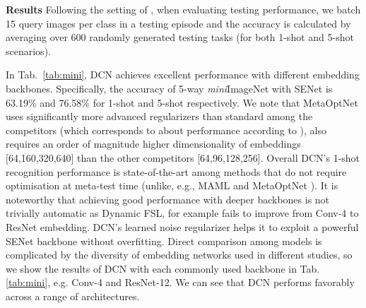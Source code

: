 \documentclass[conference]{IEEEtran}
\def\modelnameshort{DCN}
\def\miniIN{\textit{mini}ImageNet}
\newcommand{\cut}[1]{}
\newcommand{\keypoint}[1]{\vspace{0.05cm}\noindent\textbf{#1}\quad}
\begin{document}
\keypoint{Results}
Following the setting of \cite{snell2017prototypical}, when evaluating testing performance, we batch 15 query images per class in a testing episode and the accuracy is calculated by averaging over 600 randomly generated testing tasks (for both 1-shot and 5-shot scenarios). 
\cut{Firstly, our idea of learned Gaussian noise for better regularisation and multiple metrics can be applied to other metric learning methods (e.g. ProtoNet \cite{snell2017prototypical}), We extended ProtoNet to use four metrics instead of one, and also adding the learned Gaussian Noise for regularisation. Also, for fair comparison, we control different embedding backbones. The results of 5-way-1-shot in Tab~\ref{tab:first} show that while learned noise and multiple metrics also improve the performance of ProtoNet, \modelnameshort{} (RelationNet with 4 metrics and learned noise) is still the best.}
In Tab.~\ref{tab:mini}, \modelnameshort{} achieves excellent performance with different embedding backbones. Specifically, the accuracy of 5-way \miniIN{} with SENet is 63.19\% and 76.58\% for 1-shot and 5-shot respectively. We note that MetaOptNet \cite{lee2019meta} uses significantly more advanced regularizers than standard among the competitors (which corresponds to about  performance according to \cite{lee2019meta}), also requires an order of magnitude higher dimensionality of embeddings [64,160,320,640] than the other competitors [64,96,128,256]. Overall DCN's 1-shot recognition performance is state-of-the-art among methods that do not require optimisation at meta-test time (unlike, e.g., MAML \cite{finn2017model} and MetaOptNet \cite{lee2019meta}). It is noteworthy that achieving good performance with deeper backbones is not trivially automatic as Dynamic FSL, for example fails to improve from Conv-4 to ResNet embedding. DCN's learned noise regularizer helps it to exploit a powerful SENet backbone without overfitting. Direct comparison among models is complicated by the diversity of embedding networks used in different studies, so we show the results of DCN with each commonly used backbone in Tab.\ref{tab:mini}, e.g. Conv-4 and ResNet-12. We can see that DCN performs favorably across a range of architectures.
\end{document}
